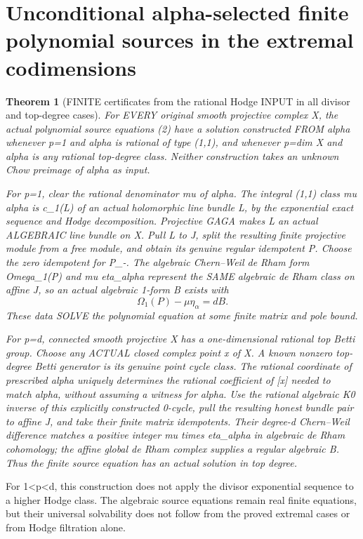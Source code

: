 \documentclass[11pt]{article}
\newtheorem{theorem}{Theorem}[section]
\begin{document}
\section{Unconditional alpha-selected finite polynomial sources in the extremal codimensions}
\begin{theorem}[FINITE certificates from the rational Hodge INPUT in all divisor and top-degree cases]
For EVERY original smooth projective complex X,
the actual polynomial source equations (2)
have a solution constructed FROM alpha
whenever p=1 and alpha is rational of type (1,1),
and whenever p=dim X and alpha is any rational
top-degree class. Neither construction
takes an unknown Chow preimage of alpha as input.

For p=1, clear the rational denominator mu of alpha.
The integral (1,1) class mu alpha is c_1(L)
of an actual holomorphic line bundle L,
by the exponential exact sequence and
Hodge decomposition. Projective GAGA makes
L an actual ALGEBRAIC line bundle on X.
Pull L to J, split the resulting finite
projective module from a free module,
and obtain its genuine regular idempotent P.
Choose the zero idempotent for P_-.
The algebraic Chern--Weil de Rham form
Omega_1(P) and mu eta_alpha represent
the SAME algebraic de Rham class on affine J,
so an actual algebraic 1-form B exists with
\[
 \boxed{\Omega_1(P)-\mu\eta_\alpha=dB.}          \tag{10}
\]
These data SOLVE the polynomial equation
at some finite matrix and pole bound.

For p=d, connected smooth projective X
has a one-dimensional rational top Betti
group. Choose any ACTUAL closed complex
point x of X. A known nonzero top-degree
Betti generator is its genuine point
cycle class. The rational coordinate
of prescribed alpha uniquely determines
the rational coefficient of [x] needed
to match alpha, without assuming a
witness for alpha. Use the rational
algebraic K0 inverse of this explicitly
constructed 0-cycle, pull the resulting
honest bundle pair to affine J, and
take their finite matrix idempotents.
Their degree-d Chern--Weil difference
matches a positive integer mu times
eta_alpha in algebraic de Rham cohomology;
the affine global de Rham complex
supplies a regular algebraic B.
Thus the finite source equation
has an actual solution in top degree.
\end{theorem}

For 1<p<d, this construction does
not apply the divisor exponential
sequence to a higher Hodge class.
The algebraic source equations
remain real finite equations, but
their universal solvability does not
follow from the proved extremal
cases or from Hodge filtration alone.
\end{document}
